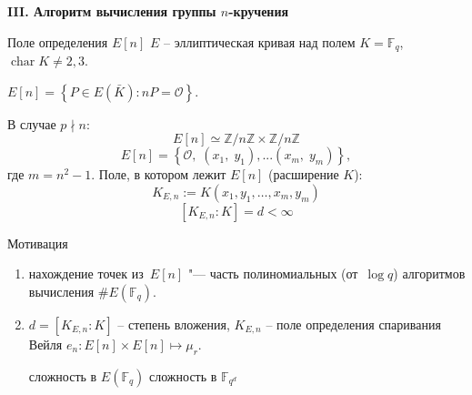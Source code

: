 \documentclass{beamer}
\begin{document}
\begin{frame}
	\begin{center}
		\textcolor{title-and-section-color}{{\LARGE \textbf{III. Алгоритм вычисления группы $n$-кручения}}}
	\end{center}
\end{frame}


\begin{frame}{Поле определения $E[n]$}
	$E$ -- эллиптическая кривая над полем $K = \mathbb{F}_q$, $\operatorname{char}{K} \ne 2,3$.
	
	\vspace{0.5em}
	 $E[n] = \left\{ {P \in E\left( \bar{K} \right) : nP = \mathcal{O}} \right\}$.
	
	В случае $p \nmid n$:
	\[
	E\left[ n \right] \simeq \mathbb{Z}/n\mathbb{Z} \times \mathbb{Z}/n\mathbb{Z}
	\]
	\structure{
		\[\Downarrow\]
	}
	\[
	E\left[n\right] = \left\{ {\mathcal{O},\;\left( {{x_1},\;{y_1}} \right), ... \left( {{x_m},\;{y_m}} \right)} \right\},
	\]
	где $m=n^2-1$.
	\structure{
		\[\Downarrow\]
	}
	Поле, в котором лежит $E\left[ n \right]$ (расширение
	$K$):
	\[
	K_{E,n} := K\left( {{x_1}, {y_1}, \ldots, x_m, y_m} \right)
	\]
	\[
	\left[ K_{E,n} : K \right] = d < \infty 
	\]
\end{frame}

\begin{frame}{Мотивация}
	\begin{enumerate}
		\item нахождение точек из~$E[n]$ "--- часть полиномиальных (от~$\log{q}$) алгоритмов вычисления $\#E(\mathbb{F}_q)$.
		\item $d = [K_{E,n} : K]$ -- степень вложения, $K_{E,n}$ -- поле определения спаривания Вейля $e_n: E[n] \times E[n] \mapsto \mu_r$.
		\begin{center}
			\structure{$\Downarrow$}
		\end{center}
		сложность  в $E(\mathbb{F}_q)$ \structure{$\rightleftarrows$} сложность  в $\mathbb{F}_{q^{d}}$
	\end{enumerate}
\end{frame}
\end{document}
